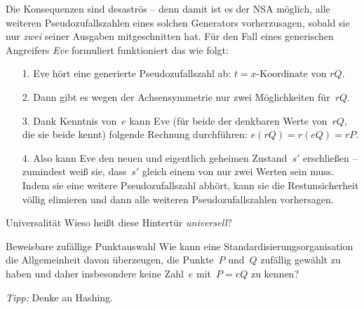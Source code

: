 \documentclass{../zirkelblatt}
\begin{document}
Die Konsequenzen sind desaströs -- denn damit ist es der NSA möglich,
alle weiteren Pseudozufallszahlen eines solchen Generators vorherzusagen,
sobald sie nur \emph{zwei} seiner Ausgaben mitgeschnitten hat.
Für den Fall eines generischen Angreifers \emph{Eve} formuliert funktioniert das wie folgt:

\begin{enumerate}
\item[1.] Eve hört eine generierte Pseudozufallszahl ab: $t =
\text{$x$-Koordinate von~$rQ$}$.
\item[2.] Dann gibt es wegen der Achsensymmetrie nur zwei Möglichkeiten
für~$rQ$.
\item[3.] Dank Kenntnis von~$e$ kann Eve (für beide der denkbaren Werte
von~$rQ$, die sie beide kennt) folgende Rechnung durchführen: $e(rQ) = r(eQ) =
rP$.
\item[4.] Also kann Eve den neuen und eigentlich geheimen Zustand~$s'$
erschließen -- zumindest weiß sie, dass~$s'$ gleich einem von nur zwei Werten
sein muss. Indem sie eine weitere Pseudozufallszahl abhört, kann sie die
Restunsicherheit völlig elimieren und dann alle weiteren Pseudozufallszahlen
vorhersagen.
\end{enumerate}

\begin{aufgabeShaded}{Universalität}
Wieso heißt diese Hintertür \emph{universell}?
\end{aufgabeShaded}

\begin{aufgabeShaded}{Beweisbare zufällige Punktauswahl}
Wie kann eine Standardisierungsorganisation die Allgemeinheit davon überzeugen,
die Punkte~$P$ und~$Q$ zufällig gewählt zu haben und daher insbesondere keine
Zahl~$e$ mit~$P = eQ$ zu kennen?

\emph{Tipp:} Denke an Hashing.
\end{aufgabeShaded}

\renewcommand{\thefootnote}{\fnsymbol{footnote}}
\end{document}
